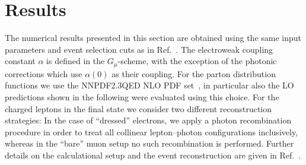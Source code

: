 \documentclass[11pt]{cernrep}
\begin{document}
\section{Results}
\label{sec:dyew:results}

The numerical results presented in this section are obtained using 
the same input parameters and event selection cuts as in 
Ref.~\cite{Dittmaier:2015rxo}. The electroweak coupling constant 
$\alpha$ is defined in the $G_\mu$-scheme, with the exception of 
the photonic corrections which use $\alpha(0)$ as their coupling. 
For the parton distribution functions we use the NNPDF2.3QED NLO PDF 
set~\cite{Ball:2012cx}, in particular also the LO predictions shown in 
the following were evaluated using this choice. For the charged 
leptons in the final state we consider two different reconstruction 
strategies: In the case of ``dressed'' electrons, we apply a photon 
recombination procedure in order to treat all collinear 
lepton--photon configurations inclusively, whereas in the ``bare'' 
muon setup no such recombination is performed. Further details on 
the calculational setup and the event reconstruction are given in 
Ref.~\cite{Dittmaier:2015rxo}.
\end{document}
